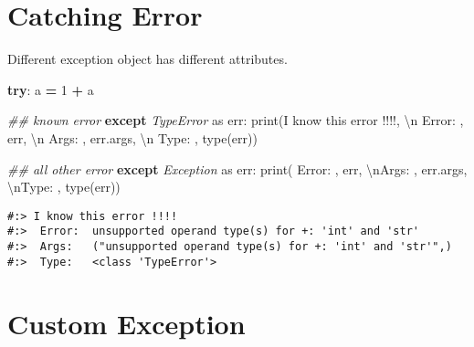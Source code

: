 \documentclass[
]{book}
\newenvironment{Shaded}{\begin{snugshade}}{\end{snugshade}}
\newcommand{\BuiltInTok}[1]{#1}
\newcommand{\CharTok}[1]{\textcolor[rgb]{0.5,0.5,0.5}{#1}}
\newcommand{\CommentTok}[1]{\textcolor[rgb]{0.37,0.37,0.37}{\textit{#1}}}
\newcommand{\ControlFlowTok}[1]{\textcolor[rgb]{0.27,0.27,0.27}{\textbf{#1}}}
\newcommand{\DecValTok}[1]{\textcolor[rgb]{0.06,0.06,0.06}{#1}}
\newcommand{\ImportTok}[1]{#1}
\newcommand{\NormalTok}[1]{#1}
\newcommand{\OperatorTok}[1]{\textcolor[rgb]{0.43,0.43,0.43}{\textbf{#1}}}
\newcommand{\PreprocessorTok}[1]{\textcolor[rgb]{0.37,0.37,0.37}{\textit{#1}}}
\newcommand{\StringTok}[1]{\textcolor[rgb]{0.5,0.5,0.5}{#1}}
\begin{document}
\hypertarget{catching-error}{%
\section{Catching Error}\label{catching-error}}

Different exception object has different attributes.

\begin{Shaded}
\begin{Highlighting}[]
\ControlFlowTok{try}\NormalTok{:}
\NormalTok{  a }\OperatorTok{=} \DecValTok{1} \OperatorTok{+} \StringTok{\textquotesingle{}a\textquotesingle{}}
  
\CommentTok{\#\# known error  }
\ControlFlowTok{except} \PreprocessorTok{TypeError} \ImportTok{as}\NormalTok{ err:}
  \BuiltInTok{print}\NormalTok{(}\StringTok{\textquotesingle{}I know this error !!!!\textquotesingle{}}\NormalTok{,}
        \StringTok{\textquotesingle{}}\CharTok{\textbackslash{}n}\StringTok{ Error: \textquotesingle{}}\NormalTok{, err,}
        \StringTok{\textquotesingle{}}\CharTok{\textbackslash{}n}\StringTok{ Args:  \textquotesingle{}}\NormalTok{, err.args,}
        \StringTok{\textquotesingle{}}\CharTok{\textbackslash{}n}\StringTok{ Type:  \textquotesingle{}}\NormalTok{, }\BuiltInTok{type}\NormalTok{(err))}

\CommentTok{\#\# all other error}
\ControlFlowTok{except} \PreprocessorTok{Exception} \ImportTok{as}\NormalTok{ err:}
  \BuiltInTok{print}\NormalTok{( }\StringTok{\textquotesingle{}Error: \textquotesingle{}}\NormalTok{, err,}
         \StringTok{\textquotesingle{}}\CharTok{\textbackslash{}n}\StringTok{Args:  \textquotesingle{}}\NormalTok{, err.args,}
         \StringTok{\textquotesingle{}}\CharTok{\textbackslash{}n}\StringTok{Type:  \textquotesingle{}}\NormalTok{, }\BuiltInTok{type}\NormalTok{(err))}
\end{Highlighting}
\end{Shaded}

\begin{verbatim}
#:> I know this error !!!! 
#:>  Error:  unsupported operand type(s) for +: 'int' and 'str' 
#:>  Args:   ("unsupported operand type(s) for +: 'int' and 'str'",) 
#:>  Type:   <class 'TypeError'>
\end{verbatim}

\hypertarget{custom-exception}{%
\section{Custom Exception}\label{custom-exception}}
\end{document}
